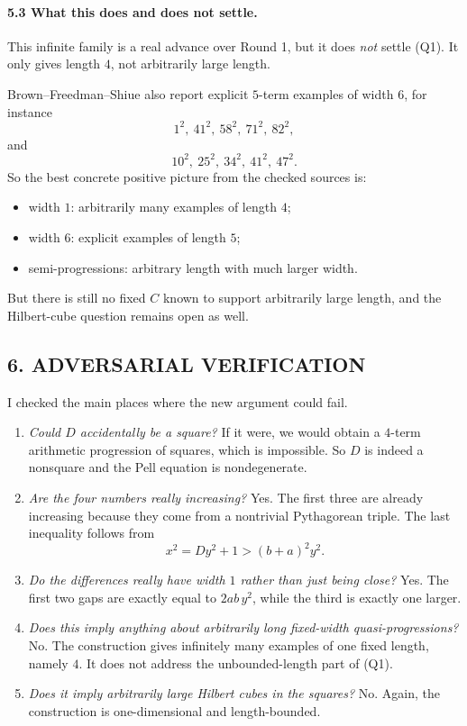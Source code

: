 \paragraph{5.3 What this does and does not settle.}

This infinite family is a real advance over Round 1, but it does \emph{not} settle (Q1). It only gives length $4$, not arbitrarily large length.

Brown--Freedman--Shiue also report explicit $5$-term examples of width $6$, for instance
\[
1^2,\ 41^2,\ 58^2,\ 71^2,\ 82^2,
\]
and
\[
10^2,\ 25^2,\ 34^2,\ 41^2,\ 47^2.
\]
So the best concrete positive picture from the checked sources is:

\begin{itemize}
\item width $1$: arbitrarily many examples of length $4$;
\item width $6$: explicit examples of length $5$;
\item semi-progressions: arbitrary length with much larger width.
\end{itemize}

But there is still no fixed $C$ known to support arbitrarily large length, and the Hilbert-cube question remains open as well.

\subsection*{6. ADVERSARIAL VERIFICATION}

I checked the main places where the new argument could fail.

\begin{enumerate}
\item \emph{Could $D$ accidentally be a square?}  
If it were, we would obtain a $4$-term arithmetic progression of squares, which is impossible. So $D$ is indeed a nonsquare and the Pell equation is nondegenerate.

\item \emph{Are the four numbers really increasing?}  
Yes. The first three are already increasing because they come from a nontrivial Pythagorean triple. The last inequality follows from
\[
x^2=Dy^2+1>(b+a)^2y^2.
\]

\item \emph{Do the differences really have width $1$ rather than just being close?}  
Yes. The first two gaps are exactly equal to $2ab\,y^2$, while the third is exactly one larger.

\item \emph{Does this imply anything about arbitrarily long fixed-width quasi-progressions?}  
No. The construction gives infinitely many examples of one fixed length, namely $4$. It does not address the unbounded-length part of (Q1).

\item \emph{Does it imply arbitrarily large Hilbert cubes in the squares?}  
No. Again, the construction is one-dimensional and length-bounded.
\end{enumerate}

